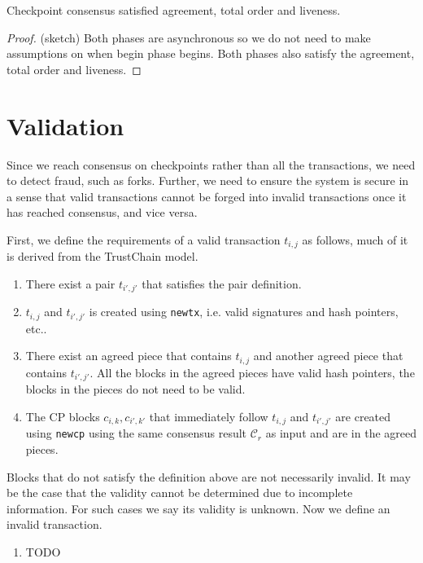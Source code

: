 \begin{theorem}
  Checkpoint consensus satisfied agreement, total order and liveness.
\end{theorem}
\begin{proof}
  (sketch) Both phases are asynchronous so we do not need to make assumptions on
  when begin phase begins. Both phases also satisfy the agreement, total order
  and liveness.
\end{proof}

\section{Validation}\label{sec:validation}

Since we reach consensus on checkpoints rather than all the transactions, we
need to detect fraud, such as forks. Further, we need to ensure the system is
secure in a sense that valid transactions cannot be forged into invalid
transactions once it has reached consensus, and vice versa.

First, we define the requirements of a valid transaction $t_{i,j}$ as follows,
much of it is derived from the TrustChain model.

\begin{enumerate}
\item There exist a pair $t_{i', j'}$ that satisfies the pair definition.
\item $t_{i,j}$ and $t_{i', j'}$ is created using \texttt{newtx}, i.e. valid
  signatures and hash pointers, etc..
\item There exist an agreed piece that contains $t_{i, j}$ and another agreed
  piece that contains $t_{i', j'}$. All the blocks in the agreed pieces have
  valid hash pointers, the blocks in the pieces do not need to be valid.
\item The CP blocks $c_{i, k}, c_{i', k'}$ that immediately follow $t_{i, j}$
  and $t_{i', j'}$ are created using \texttt{newcp} using the same consensus
  result $\mathcal{C}_r$ as input and are in the agreed pieces.
\end{enumerate}

Blocks that do not satisfy the definition above are not necessarily invalid. It
may be the case that the validity cannot be determined due to incomplete
information. For such cases we say its validity is unknown.
Now we define an invalid transaction.

\begin{enumerate}
\item TODO
\end{enumerate}

